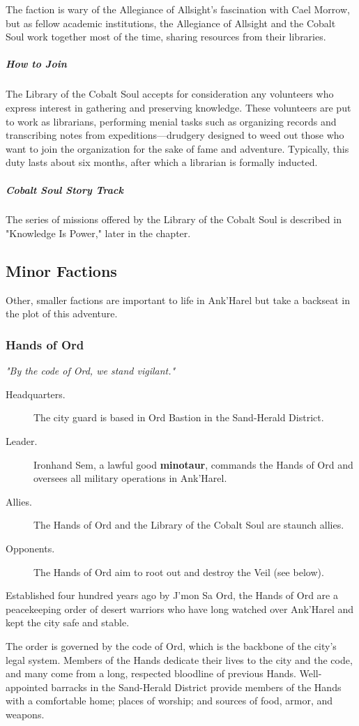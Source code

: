 \documentclass[10pt,a4paper,twoside,bg=print,twocolumn,openany,nodeprecatedcode]{dndbook}
\begin{document}
The faction is wary of the Allegiance of Allsight's fascination with Cael Morrow, but as fellow academic institutions, the Allegiance of Allsight and the Cobalt Soul work together most of the time, sharing resources from their libraries.

\subparagraph{How to Join}
The Library of the Cobalt Soul accepts for consideration any volunteers who express interest in gathering and preserving knowledge. These volunteers are put to work as librarians, performing menial tasks such as organizing records and transcribing notes from expeditions—drudgery designed to weed out those who want to join the organization for the sake of fame and adventure. Typically, this duty lasts about six months, after which a librarian is formally inducted.

\subparagraph{Cobalt Soul Story Track}
The series of missions offered by the Library of the Cobalt Soul is described in "Knowledge Is Power," later in the chapter.

\subsection{Minor Factions}
Other, smaller factions are important to life in Ank'Harel but take a backseat in the plot of this adventure.

\subsubsection{Hands of Ord}
\textit{"By the code of Ord, we stand vigilant."}


\begin{description}
\item[Headquarters.]
The city guard is based in Ord Bastion in the Sand-Herald District.
\item[Leader.]
Ironhand Sem, a lawful good \textbf{minotaur}, commands the Hands of Ord and oversees all military operations in Ank'Harel.
\item[Allies.]
The Hands of Ord and the Library of the Cobalt Soul are staunch allies.
\item[Opponents.]
The Hands of Ord aim to root out and destroy the Veil (see below).
\end{description}

Established four hundred years ago by J'mon Sa Ord, the Hands of Ord are a peacekeeping order of desert warriors who have long watched over Ank'Harel and kept the city safe and stable.

The order is governed by the code of Ord, which is the backbone of the city's legal system. Members of the Hands dedicate their lives to the city and the code, and many come from a long, respected bloodline of previous Hands. Well-appointed barracks in the Sand-Herald District provide members of the Hands with a comfortable home; places of worship; and sources of food, armor, and weapons.
\end{document}
